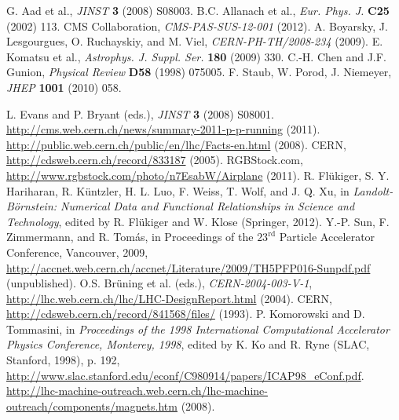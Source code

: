 \documentclass[12pt, letterpaper]{report}
\begin{document}
\begin{thebibliography}{99}
 G. Aad et al., \textit{JINST} \textbf{3} (2008) S08003.
 B.C. Allanach et al., \textit{Eur. Phys. J.} \textbf{C25} (2002) 113.
 CMS Collaboration, \textit{CMS-PAS-SUS-12-001} (2012).
 A. Boyarsky, J. Lesgourgues, O. Ruchayskiy, and M. Viel, \textit{CERN-PH-TH/2008-234} (2009).
 E. Komatsu et al., \textit{Astrophys. J. Suppl. Ser.} \textbf{180} (2009) 330.
 C.-H. Chen and J.F. Gunion, \textit{Physical Review} \textbf{D58} (1998) 075005.
 F. Staub, W. Porod, J. Niemeyer, \textit{JHEP} \textbf{1001} (2010) 058.


 L. Evans and P. Bryant (eds.), \textit{JINST} \textbf{3} (2008) S08001.
 \url{http://cms.web.cern.ch/news/summary-2011-p-p-running} (2011).
 \url{http://public.web.cern.ch/public/en/lhc/Facts-en.html} (2008).
 CERN, \url{http://cdsweb.cern.ch/record/833187} (2005).
 RGBStock.com, \url{http://www.rgbstock.com/photo/n7EsabW/Airplane} (2011).
 R. Fl\"{u}kiger, S. Y. Hariharan, R. K\"{u}ntzler, H. L. Luo, F. Weiss, T. Wolf, and J. Q. Xu, in \textit{Landolt-B\"{o}rnstein: Numerical Data and Functional Relationships in Science and Technology}, edited by R. Fl\"{u}kiger and W. Klose (Springer, 2012).
 Y.-P. Sun, F. Zimmermann, and R. Tom\'{a}s, in Proceedings of the $23^{\mathrm{rd}}$ Particle Accelerator Conference, Vancouver, 2009, \url{http://accnet.web.cern.ch/accnet/Literature/2009/TH5PFP016-Sunpdf.pdf} (unpublished).
 O.S. Br\"{u}ning et al. (eds.), \textit{CERN-2004-003-V-1}, \url{http://lhc.web.cern.ch/lhc/LHC-DesignReport.html} (2004).
 CERN, \url{http://cdsweb.cern.ch/record/841568/files/} (1993).
 P. Komorowski and D. Tommasini, in \textit{Proceedings of the 1998 International Computational Accelerator Physics Conference, Monterey, 1998}, edited by K. Ko and R. Ryne (SLAC, Stanford, 1998), p. 192, \url{http://www.slac.stanford.edu/econf/C980914/papers/ICAP98_eConf.pdf}.
 \url{http://lhc-machine-outreach.web.cern.ch/lhc-machine-outreach/components/magnets.htm} (2008).



\end{thebibliography}
\end{document}
